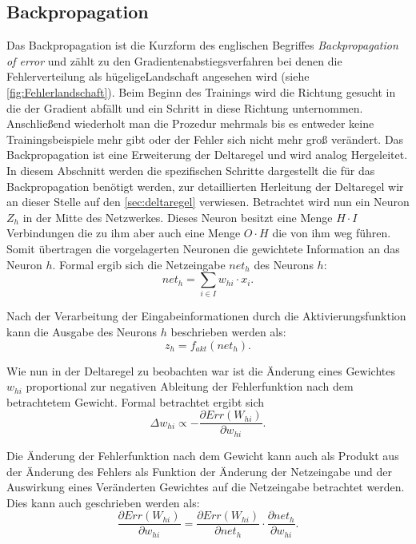 \subsection{Backpropagation}\label{sec:Backpropagation}
Das Backpropagation ist die Kurzform des englischen Begriffes \textit{Backpropagation of error} und zählt zu den Gradientenabstiegsverfahren bei denen die Fehlerverteilung als \glqq hügelige\grqq Landschaft angesehen wird (siehe \autoref{fig:Fehlerlandschaft}). Beim Beginn des Trainings wird die Richtung gesucht in die der Gradient abfällt und ein Schritt in diese Richtung unternommen. Anschließend wiederholt man die Prozedur mehrmals bis es entweder keine Trainingsbeispiele mehr gibt oder der Fehler sich nicht mehr groß verändert. Das Backpropagation ist eine Erweiterung der Deltaregel und wird analog Hergeleitet. In diesem Abschnitt werden die spezifischen Schritte dargestellt die für das Backpropagation benötigt werden, zur detaillierten Herleitung der Deltaregel wir an dieser Stelle auf den \autoref{sec:deltaregel} verwiesen.
Betrachtet wird nun ein Neuron $Z_h$ in der Mitte des Netzwerkes. Dieses Neuron besitzt eine Menge $H \cdot I$ Verbindungen die zu ihm aber auch eine Menge $O \cdot H$ die von ihm weg führen. Somit übertragen die vorgelagerten Neuronen die gewichtete Information an das Neuron $h$. Formal ergib sich die Netzeingabe $net_{h}$ des Neurons $h$:
\begin{equation}
net_{h} = \sum_{i \in I} w_{hi} \cdot x_{i} .
\label{gl:neth}
\end{equation}

Nach der Verarbeitung der Eingabeinformationen durch die Aktivierungsfunktion kann die Ausgabe des Neurons $h$ beschrieben werden als:
\begin{equation}
z_{h}= f_{akt}(net_{h}) .
\label{gl:aktiv}
\end{equation}

Wie nun in der Deltaregel zu beobachten war ist die Änderung eines Gewichtes $w_{hi}$ proportional zur negativen Ableitung der Fehlerfunktion nach dem betrachtetem Gewicht. Formal betrachtet ergibt sich
\begin{equation*}
\Delta w_{hi} \propto -  \frac{\partial Err(W_{hi})}{\partial w_{hi}}.
\end{equation*}

Die Änderung der Fehlerfunktion nach dem Gewicht kann auch als Produkt aus der Änderung des Fehlers als Funktion der Änderung der Netzeingabe und der Auswirkung eines Veränderten Gewichtes auf die Netzeingabe betrachtet werden. Dies kann auch geschrieben werden als:
\begin{equation}
\frac{\partial Err(W_{hi})}{\partial w_{hi}} = \frac{\partial Err(W_{hi})}{\partial net_{h}} \cdot \frac{\partial net_{h}}{\partial w_{hi}}.
\label{gl:zerlket2}
\end{equation}

